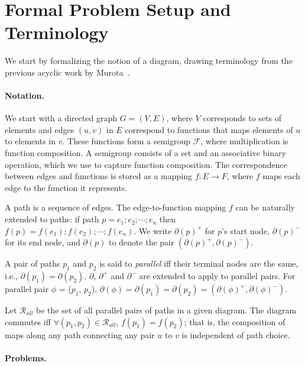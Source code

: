 \documentclass[sigplan]{acmart}
\begin{document}
\section{Formal Problem Setup and Terminology}

We start by formalizing the notion of a diagram, drawing terminology from the previous acyclic work by Murota~\cite{commutative}.

\paragraph{Notation.}

We start with a directed graph $G=(V,E)$, where $V$ corresponds to sets of elements and edges $(u, v)$ in $E$ correspond to functions that maps elements of $u$ to elements in $v$.
These functions form a semigroup $\mathcal{F}$, where multiplication is function composition.
A semigroup consists of a set and an associative binary operation, which we use to capture function composition.
%
The correspondence between edges and functions is stored as a mapping $f:E\rightarrow F$, where $f$ maps each edge to the function it represents.

A path is a sequence of edges. The edge-to-function mapping $f$ can be naturally extended to paths: if path $p=e_1 ; e_2 ; \cdots ; e_n$ then $f(p)=f(e_1) ; f(e_2) ; \cdots ; f(e_n)$.
%
We write $\partial(p)^{+}$ for $p$'s start node, $\partial(p)^{-}$ for its end node, and $\partial(p)$ to denote the pair
$(\partial(p)^{+}, \partial(p)^{-})$.

A pair of paths $p_1$ and $p_2$ is said to \textit{parallel} iff their terminal nodes are the same, i.e., $\partial(p_1)=\partial(p_2)$.
$\partial$, $\partial^{+}$ and $\partial^{-}$ are extended to apply to parallel pairs.
For parallel pair $\phi$ = ($p_1$, $p_2$), $\partial(\phi)=\partial(p_1)=\partial(p_2)=(\partial(\phi)^{+}, \partial(\phi)^{-})$.

Let $\mathcal{R}_{all}$ be the set of all parallel pairs of paths in a given diagram.
The diagram commutes iff
$\forall (p_1,p_2)\in \mathcal{R}_{all}$,
$f(p_1)=f(p_2)$; that is, the composition of maps along any path connecting any pair $u$ to $v$ is independent of path choice.

\paragraph{Problems.}
\end{document}
